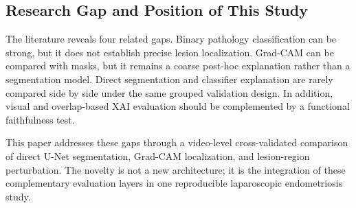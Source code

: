 \subsection{Research Gap and Position of This Study}

The literature reveals four related gaps. Binary pathology classification can be strong, but it does not establish precise lesion localization. Grad-CAM can be compared with masks, but it remains a coarse post-hoc explanation rather than a segmentation model. Direct segmentation and classifier explanation are rarely compared side by side under the same grouped validation design. In addition, visual and overlap-based XAI evaluation should be complemented by a functional faithfulness test.

This paper addresses these gaps through a video-level cross-validated comparison of direct U-Net segmentation, Grad-CAM localization, and lesion-region perturbation. The novelty is not a new architecture; it is the integration of these complementary evaluation layers in one reproducible laparoscopic endometriosis study.


